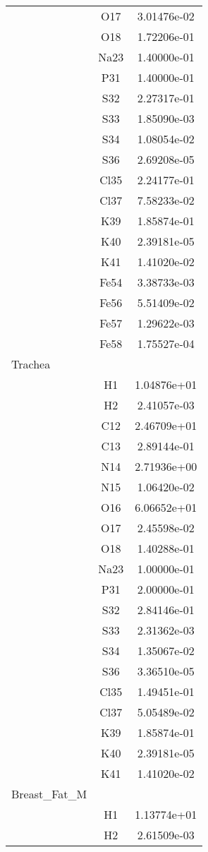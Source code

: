 \begin{centering}
\begin{longtable}{l c c}
& O17 & 3.01476e-02 \\ 
& O18 & 1.72206e-01 \\ 
& Na23 & 1.40000e-01 \\ 
& P31 & 1.40000e-01 \\ 
& S32 & 2.27317e-01 \\ 
& S33 & 1.85090e-03 \\ 
& S34 & 1.08054e-02 \\ 
& S36 & 2.69208e-05 \\ 
& Cl35 & 2.24177e-01 \\ 
& Cl37 & 7.58233e-02 \\ 
& K39 & 1.85874e-01 \\ 
& K40 & 2.39181e-05 \\ 
& K41 & 1.41020e-02 \\ 
& Fe54 & 3.38733e-03 \\ 
& Fe56 & 5.51409e-02 \\ 
& Fe57 & 1.29622e-03 \\ 
& Fe58 & 1.75527e-04 \\ 
\hline
Trachea & & \\
\hline
& H1 & 1.04876e+01 \\ 
& H2 & 2.41057e-03 \\ 
& C12 & 2.46709e+01 \\ 
& C13 & 2.89144e-01 \\ 
& N14 & 2.71936e+00 \\ 
& N15 & 1.06420e-02 \\ 
& O16 & 6.06652e+01 \\ 
& O17 & 2.45598e-02 \\ 
& O18 & 1.40288e-01 \\ 
& Na23 & 1.00000e-01 \\ 
& P31 & 2.00000e-01 \\ 
& S32 & 2.84146e-01 \\ 
& S33 & 2.31362e-03 \\ 
& S34 & 1.35067e-02 \\ 
& S36 & 3.36510e-05 \\ 
& Cl35 & 1.49451e-01 \\ 
& Cl37 & 5.05489e-02 \\ 
& K39 & 1.85874e-01 \\ 
& K40 & 2.39181e-05 \\ 
& K41 & 1.41020e-02 \\ 
\hline
Breast\_Fat\_M & & \\
\hline
& H1 & 1.13774e+01 \\ 
& H2 & 2.61509e-03 \\ 

\end{longtable}
\end{centering}
